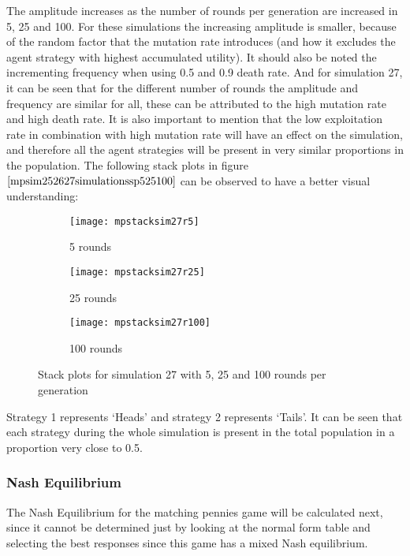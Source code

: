 The amplitude increases as the number of rounds per generation are increased in 5, 25 and 100. For these simulations the increasing amplitude is smaller, because of the random factor that the mutation rate introduces (and how it excludes the agent strategy with highest accumulated utility). It should also be noted the incrementing frequency when using 0.5 and 0.9 death rate. And for simulation 27, it can be seen that for the different number of rounds the amplitude and frequency are similar for all, these  can be attributed to the high mutation rate and high death rate. It is also important to mention that the low exploitation rate in combination with high mutation rate will have an effect on the simulation, and therefore all the agent strategies will be present in very similar proportions in the population. The following stack plots in figure $\ref{mpsim252627simulationssp525100}$  can be observed to have a better visual understanding:  

\begin{figure}[H]       
    \centering
    \begin{subfigure}[b]{0.3\textwidth}
	\centering
	{\texttt{[image: mpstacksim27r5]}}   
    	\caption{5 rounds}
	\label{fig:mpsim27sr5}
    \end{subfigure}
    \hfill
    \begin{subfigure}[b]{0.3\textwidth}
	\centering
	{\texttt{[image: mpstacksim27r25]}}   
    	\caption{25 rounds}
	\label{fig:mpsim27sr25}
    \end{subfigure}
    \hfill
    \begin{subfigure}[b]{0.3\textwidth}
	\centering
	{\texttt{[image: mpstacksim27r100]}}   
    	\caption{100 rounds}
	\label{fig:mpsim27sr100}
    \end{subfigure}
    \caption{Stack plots for simulation 27 with 5, 25 and 100 rounds per generation}
    \label{mpsim252627simulationssp525100}
\end{figure}

Strategy 1 represents `Heads' and strategy 2 represents `Tails'. It can be seen that each strategy during the whole simulation is present in the total population in a proportion very close to 0.5. 

\subsubsection{Nash Equilibrium}
The Nash Equilibrium for the matching pennies game will be calculated next, since it cannot be determined just by looking at the normal form table and selecting the best responses since this game has a mixed Nash equilibrium.

